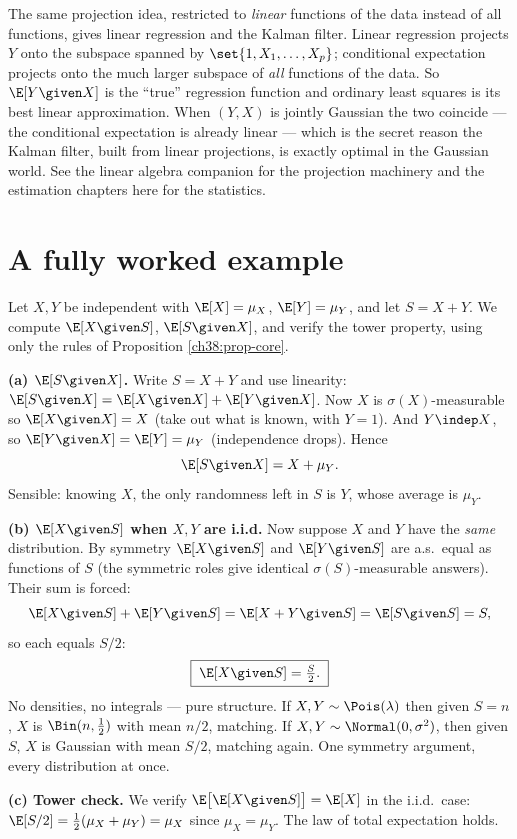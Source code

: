 \begin{connectionbox}
The same projection idea, restricted to \emph{linear} functions of the data instead of all functions,
gives linear regression and the Kalman filter. Linear regression projects $Y$ onto the subspace
spanned by $\set{1, X_1, \dots, X_p}$; conditional expectation projects onto the much larger subspace
of \emph{all} functions of the data. So $\E[Y\given X]$ is the ``true'' regression function and
ordinary least squares is its best linear approximation. When $(Y, X)$ is jointly Gaussian the two
coincide --- the conditional expectation is already linear --- which is the secret reason the Kalman
filter, built from linear projections, is exactly optimal in the Gaussian world. See the linear
algebra companion for the projection machinery and the estimation chapters here for the statistics.
\end{connectionbox}

\section{A fully worked example}
\label{ch38:worked}

\begin{example}
\label{ch38:ex-sum}
Let $X, Y$ be independent with $\E[X] = \mu_X$, $\E[Y] = \mu_Y$, and let $S = X + Y$. We compute
$\E[X \given S]$, $\E[S \given X]$, and verify the tower property, using only the rules of
Proposition \ref{ch38:prop-core}.

\textbf{(a) $\E[S\given X]$.} Write $S = X + Y$ and use linearity: $\E[S\given X] = \E[X\given X] +
\E[Y\given X]$. Now $X$ is $\sigma(X)$-measurable so $\E[X\given X] = X$ (take out what is known, with
$Y=1$). And $Y \indep X$, so $\E[Y\given X] = \E[Y] = \mu_Y$ (independence drops). Hence
\[
  \E[S\given X] = X + \mu_Y.
\]
Sensible: knowing $X$, the only randomness left in $S$ is $Y$, whose average is $\mu_Y$.

\textbf{(b) $\E[X\given S]$ when $X, Y$ are i.i.d.} Now suppose $X$ and $Y$ have the \emph{same}
distribution. By symmetry $\E[X\given S]$ and $\E[Y\given S]$ are a.s.\ equal as functions of $S$ (the
symmetric roles give identical $\sigma(S)$-measurable answers). Their sum is forced:
\[
  \E[X\given S] + \E[Y\given S] = \E[X + Y\given S] = \E[S\given S] = S,
\]
so each equals $S/2$:
\[
  \boxed{\;\E[X\given S] = \tfrac{S}{2}.\;}
\]
No densities, no integrals --- pure structure. If $X,Y \sim \Pois(\lambda)$ then given $S = n$, $X$ is
$\Bin(n, \tfrac12)$ with mean $n/2$, matching. If $X,Y \sim \Normal(0,\sigma^2)$, then given $S$, $X$
is Gaussian with mean $S/2$, matching again. One symmetry argument, every distribution at once.

\textbf{(c) Tower check.} We verify $\E\big[\E[X\given S]\big] = \E[X]$ in the i.i.d.\ case:
$\E[S/2] = \tfrac12(\mu_X + \mu_Y) = \mu_X$ since $\mu_X = \mu_Y$. The law of total expectation holds.
\end{example}

